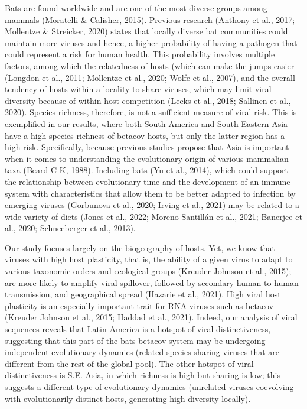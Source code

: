 \documentclass[11pt]{article}
\begin{document}
Bats are found worldwide and are one of the most diverse groups among
mammals (Moratelli \& Calisher, 2015). Previous research (Anthony et
al., 2017; Mollentze \& Streicker, 2020) states that locally diverse bat
communities could maintain more viruses and hence, a higher probability
of having a pathogen that could represent a risk for human health. This
probability involves multiple factors, among which the relatedness of
hosts (which can make the jumps easier (Longdon et al., 2011; Mollentze
et al., 2020; Wolfe et al., 2007), and the overall tendency of hosts
within a locality to share viruses, which may limit viral diversity
because of within-host competition (Leeks et al., 2018; Sallinen et al.,
2020). Species richness, therefore, is not a sufficient measure of viral
risk. This is exemplified in our results, where both South America and
South-Eastern Asia have a high species richness of betacov hosts, but
only the latter region has a high risk. Specifically, because previous
studies propose that Asia is important when it comes to understanding
the evolutionary origin of various mammalian taxa (Beard C K, 1988).
Including bats (Yu et al., 2014), which could support the relationship
between evolutionary time and the development of an immune system with
characteristics that allow them to be better adapted to infection by
emerging viruses (Gorbunova et al., 2020; Irving et al., 2021) may be
related to a wide variety of diets (Jones et al., 2022; Moreno Santillán
et al., 2021; Banerjee et al., 2020; Schneeberger et al., 2013).

Our study focuses largely on the biogeography of hosts. Yet, we know
that viruses with high host plasticity, that is, the ability of a given
virus to adapt to various taxonomic orders and ecological groups
(Kreuder Johnson et al., 2015); are more likely to amplify viral
spillover, followed by secondary human-to-human transmission, and
geographical spread (Hazarie et al., 2021). High viral host plasticity
is an especially important trait for RNA viruses such as betacov
(Kreuder Johnson et al., 2015; Haddad et al., 2021). Indeed, our
analysis of viral sequences reveals that Latin America is a hotspot of
viral distinctiveness, suggesting that this part of the bats-betacov
system may be undergoing independent evolutionary dynamics (related
species sharing viruses that are different from the rest of the global
pool). The other hotspot of viral distinctiveness is S.E. Asia, in which
richness is high but sharing is low; this suggests a different type of
evolutionary dynamics (unrelated viruses coevolving with evolutionarily
distinct hosts, generating high diversity locally).
\end{document}
